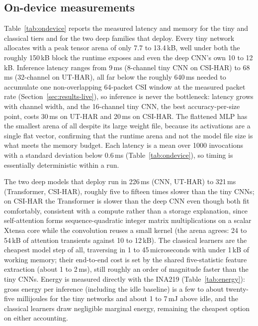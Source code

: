 \documentclass{ieeeaccess}
\begin{document}
\subsection{On-device measurements}
\label{sec:results-ondevice}
Table~\ref{tab:ondevice} reports the measured latency and memory for the tiny and classical tiers and for the two deep families that deploy. Every tiny network allocates with a peak tensor arena of only 7.7 to 13.4\,kB, well under both the roughly 150\,kB block the runtime exposes and even the deep CNN's own 10 to 12\,kB. Inference latency ranges from 9\,ms (8-channel tiny CNN on CSI-HAR) to 68\,ms (32-channel on UT-HAR), all far below the roughly 640\,ms needed to accumulate one non-overlapping 64-packet CSI window at the measured packet rate (Section~\ref{sec:results-live}), so inference is never the bottleneck: latency grows with channel width, and the 16-channel tiny CNN, the best accuracy-per-size point, costs 30\,ms on UT-HAR and 20\,ms on CSI-HAR. The flattened MLP has the smallest arena of all despite its large weight file, because its activations are a single flat vector, confirming that the runtime arena and not the model file size is what meets the memory budget. Each latency is a mean over 1000 invocations with a standard deviation below 0.6\,ms (Table~\ref{tab:ondevice}), so timing is essentially deterministic within a run.

The two deep models that deploy run in 226\,ms (CNN, UT-HAR) to 321\,ms (Transformer, CSI-HAR), roughly five to fifteen times slower than the tiny CNNs; on CSI-HAR the Transformer is slower than the deep CNN even though both fit comfortably, consistent with a compute rather than a storage explanation, since self-attention forms sequence-quadratic integer matrix multiplications on a scalar Xtensa core while the convolution reuses a small kernel (the arena agrees: 24 to 54\,kB of attention transients against 10 to 12\,kB). The classical learners are the cheapest model step of all, traversing in 1 to 45\,microseconds with under 1\,kB of working memory; their end-to-end cost is set by the shared five-statistic feature extraction (about 1 to 2\,ms), still roughly an order of magnitude faster than the tiny CNNs. Energy is measured directly with the INA219 (Table~\ref{tab:energy}): gross energy per inference (including the idle baseline) is a few to about twenty-five millijoules for the tiny networks and about 1 to 7\,mJ above idle, and the classical learners draw negligible marginal energy, remaining the cheapest option on either accounting.
\end{document}
